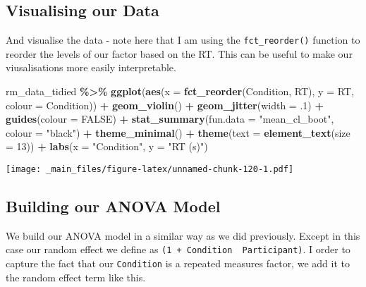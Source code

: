 \documentclass[
]{book}
\newenvironment{Shaded}{\begin{snugshade}}{\end{snugshade}}
\newcommand{\AttributeTok}[1]{\textcolor[rgb]{0.13,0.29,0.53}{#1}}
\newcommand{\ConstantTok}[1]{\textcolor[rgb]{0.56,0.35,0.01}{#1}}
\newcommand{\DecValTok}[1]{\textcolor[rgb]{0.00,0.00,0.81}{#1}}
\newcommand{\FunctionTok}[1]{\textcolor[rgb]{0.13,0.29,0.53}{\textbf{#1}}}
\newcommand{\NormalTok}[1]{#1}
\newcommand{\SpecialCharTok}[1]{\textcolor[rgb]{0.81,0.36,0.00}{\textbf{#1}}}
\newcommand{\StringTok}[1]{\textcolor[rgb]{0.31,0.60,0.02}{#1}}
\begin{document}
\hypertarget{visualising-our-data-1}{%
\subsection{Visualising our Data}\label{visualising-our-data-1}}

And visualise the data - note here that I am using the \texttt{fct\_reorder()} function to reorder the levels of our factor based on the RT. This can be useful to make our viusalisations more easily interpretable.

\begin{Shaded}
\begin{Highlighting}[]
\NormalTok{rm\_data\_tidied }\SpecialCharTok{\%\textgreater{}\%}
  \FunctionTok{ggplot}\NormalTok{(}\FunctionTok{aes}\NormalTok{(}\AttributeTok{x =} \FunctionTok{fct\_reorder}\NormalTok{(Condition, RT), }\AttributeTok{y =}\NormalTok{ RT, }\AttributeTok{colour =}\NormalTok{ Condition)) }\SpecialCharTok{+}
  \FunctionTok{geom\_violin}\NormalTok{() }\SpecialCharTok{+}
  \FunctionTok{geom\_jitter}\NormalTok{(}\AttributeTok{width =}\NormalTok{ .}\DecValTok{1}\NormalTok{) }\SpecialCharTok{+}
  \FunctionTok{guides}\NormalTok{(}\AttributeTok{colour =} \ConstantTok{FALSE}\NormalTok{) }\SpecialCharTok{+}
  \FunctionTok{stat\_summary}\NormalTok{(}\AttributeTok{fun.data =} \StringTok{"mean\_cl\_boot"}\NormalTok{, }\AttributeTok{colour =} \StringTok{"black"}\NormalTok{) }\SpecialCharTok{+}
  \FunctionTok{theme\_minimal}\NormalTok{() }\SpecialCharTok{+}
  \FunctionTok{theme}\NormalTok{(}\AttributeTok{text =} \FunctionTok{element\_text}\NormalTok{(}\AttributeTok{size =} \DecValTok{13}\NormalTok{)) }\SpecialCharTok{+}
  \FunctionTok{labs}\NormalTok{(}\AttributeTok{x =} \StringTok{"Condition"}\NormalTok{, }\AttributeTok{y =} \StringTok{"RT (s)"}\NormalTok{)}
\end{Highlighting}
\end{Shaded}

\texttt{[image: \_main\_files/figure-latex/unnamed-chunk-120-1.pdf]}

\hypertarget{building-our-anova-model-1}{%
\subsection{Building our ANOVA Model}\label{building-our-anova-model-1}}

We build our ANOVA model in a similar way as we did previously. Except in this case our random effect we define as \texttt{(1\ +\ Condition\ \textbar{}\ Participant)}. I order to capture the fact that our \texttt{Condition} is a repeated measures factor, we add it to the random effect term like this.
\end{document}

